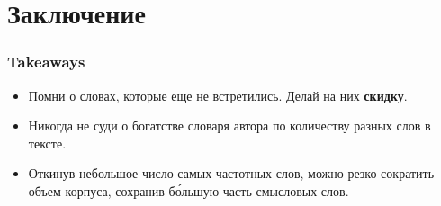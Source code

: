 \documentclass[svgnames]{beamer}
\begin{document}
\section*{Заключение}

\begin{frame}
  \frametitle{Takeaways}
  \begin{itemize}
  \item Помни о словах, которые еще не встретились. Делай на них
    \textbf{скидку}. 
  \item Никогда не суди о богатстве словаря автора по количеству разных слов в
    тексте. 
  \item Откинув небольшое число самых частотных слов, можно резко
    сократить объем корпуса, сохранив б\'{о}льшую часть смысловых слов.
  \end{itemize}
\end{frame}
\end{document}
